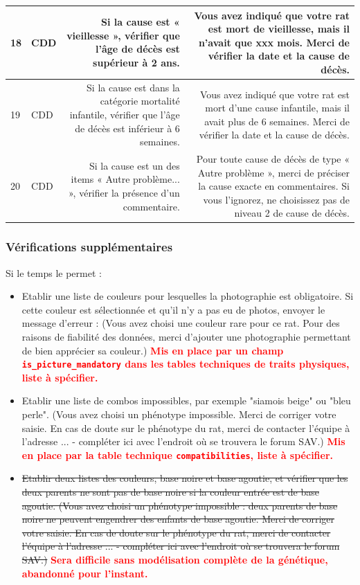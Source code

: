 ﻿\documentclass[a4paper,10pt]{article}
\newcommand\desire[1]{\noindent\textbf{\textcolor{red}{#1}}}
\begin{document}
\begin{tabularx}{\textwidth}{|l|l|R|R|}
18 & CDD & Si la cause est « vieillesse », vérifier que l'âge de décès est supérieur à 2 ans. & Vous avez indiqué que votre rat est mort de vieillesse, mais il n'avait que xxx mois. Merci de vérifier la date et la cause de décès.\\\hline


19 & CDD & Si la cause est dans la catégorie mortalité infantile, vérifier que l'âge de décès est inférieur à 6 semaines. & Vous avez indiqué que votre rat est mort d'une cause infantile, mais il avait plus de 6 semaines. Merci de vérifier la date et la cause de décès.\\\hline


20 & CDD & Si la cause est un des items « Autre problème... », vérifier la présence d'un commentaire. & Pour toute cause de décès de type « Autre problème », merci de préciser la cause exacte en commentaires. Si vous l'ignorez, ne choisissez pas de niveau 2 de cause de décès.\\\hline

\end{tabularx}
\normalsize

\subsubsection{Vérifications supplémentaires}

Si le temps le permet : 

\begin{itemize}
\item Etablir une liste de couleurs pour lesquelles la photographie est obligatoire. Si cette couleur est sélectionnée et qu'il n'y a pas eu de photos, envoyer le message d'erreur : (Vous avez choisi une couleur rare pour ce rat. Pour des raisons de fiabilité des données, merci d'ajouter une photographie permettant de bien apprécier sa couleur.) \desire{Mis en place par un champ \texttt{is\_picture\_mandatory} dans les tables techniques de traits physiques, liste à spécifier.}
\item Etablir une liste de combos impossibles, par exemple "siamois beige" ou "bleu perle". (Vous avez choisi un phénotype impossible. Merci de corriger votre saisie. En cas de doute sur le phénotype du rat, merci de contacter l'équipe à l'adresse ... - compléter ici avec l'endroit où se trouvera le forum SAV.) \desire{Mis en place par la table technique \texttt{compatibilities}, liste à spécifier.}
\item \sout{Etablir deux listes des couleurs, base noire et base agoutie, et vérifier que les deux parents ne sont pas de base noire si la couleur entrée est de base agoutie. (Vous avez choisi un phénotype impossible : deux parents de base noire ne peuvent engendrer des enfants de base agoutie. Merci de corriger votre saisie. En cas de doute sur le phénotype du rat, merci de contacter l'équipe à l'adresse ... - compléter ici avec l'endroit où se trouvera le forum SAV.)} \desire{Sera difficile sans modélisation complète de la génétique, abandonné pour l'instant.}
\end{itemize}
\end{document}
